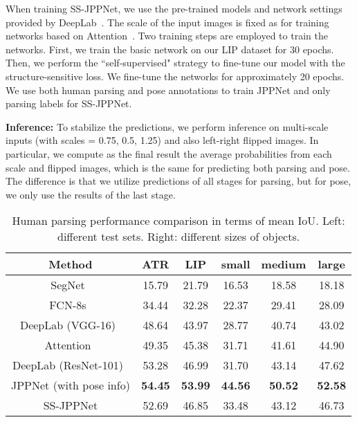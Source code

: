 \documentclass[10pt,journal,compsoc]{IEEEtran}
\begin{document}
When training SS-JPPNet, we use the pre-trained models and network settings provided by DeepLab~\cite{chen2016deeplab}. The scale of the input images is fixed as  for training networks based on Attention~\cite{chen2015attention}. Two training steps are employed to train the networks. First, we train the basic network on our LIP dataset for 30 epochs. Then, we perform the ``self-supervised" strategy to fine-tune our model with the structure-sensitive loss. We fine-tune the networks for approximately 20 epochs. We use both human parsing and pose annotations to train JPPNet and only parsing labels for SS-JPPNet.

\textbf{Inference: }
To stabilize the predictions, we perform inference on multi-scale inputs (with scales = {0.75, 0.5, 1.25}) and also left-right flipped images. In particular, we compute as the final result the average probabilities from each scale and flipped images, which is the same for predicting both parsing and pose. The difference is that we utilize predictions of all stages for parsing, but for pose, we only use the results of the last stage.


\begin{table}[t]
\centering
\scriptsize
\caption{Human parsing performance comparison in terms of mean IoU. Left: different test sets. Right: different sizes of objects.}
\vspace{-3mm}
\label{tab: lip_size}
\begin{tabular}{c|cc|ccc}
\toprule[0.5pt]
Method                                     & ATR     & LIP      & small   & medium   & large     \\ \hline 
SegNet~\cite{badrinarayanan2015segnet}     & 15.79   & 21.79    & 16.53   & 18.58    & 18.18     \\
FCN-8s~\cite{long2014fully}                & 34.44   & 32.28    & 22.37   & 29.41    & 28.09     \\ 
DeepLab (VGG-16)~\cite{chen2016deeplab}     & 48.64   & 43.97    & 28.77   & 40.74    & 43.02    \\
Attention~\cite{chen2015attention}         & 49.35   & 45.38    & 31.71   & 41.61    & 44.90     \\ 
DeepLab (ResNet-101)~\cite{chen2016deeplab} & 53.28   & 46.99    & 31.70   & 43.14    & 47.62    \\ \hline
JPPNet  (with pose info)   & \textbf{54.45} & \textbf{53.99} & \textbf{44.56} & \textbf{50.52} & \textbf{52.58}    \\
SS-JPPNet                            & 52.69   & 46.85    & 33.48   & 43.12    & 46.73     \\
\toprule[0.5pt]
\end{tabular}
\end{table}
\end{document}
